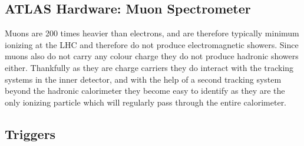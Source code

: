\subsection{ATLAS Hardware: Muon Spectrometer}
Muons are 200 times heavier than electrons, and are therefore typically minimum ionizing at the LHC and therefore do not produce electromagnetic showers.  
Since muons also do not carry any colour charge they do not produce hadronic showers either.  
Thankfully as they are charge carriers they do interact with the tracking systems in the inner detector, and with the help of a second tracking system beyond the hadronic calorimeter they become easy to identify as they are the only ionizing particle which will regularly pass through the entire calorimeter.   
 


\subsection{Triggers}
\label{Trig}
